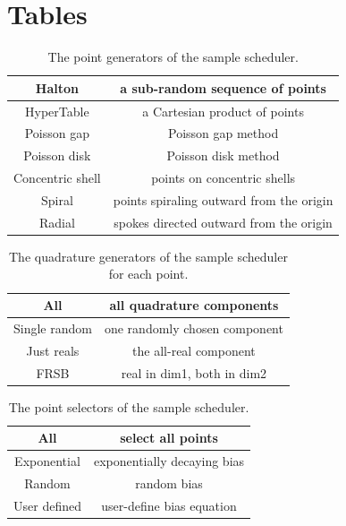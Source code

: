 \clearpage
\section{Tables}

\begin{table}[h]
  \begin{tabular}{ | c | c | }
    \hline
    Halton          &  a sub-random sequence of points            \\  \hline
    HyperTable      &  a Cartesian product of points              \\  \hline
    Poisson gap     &  Poisson gap method \\  \hline
    Poisson disk    &  Poisson disk method  \\  \hline
    Concentric shell & points on concentric shells               \\  \hline
    Spiral          &  points spiraling outward from the origin  \\  \hline
    Radial          &  spokes directed outward from the origin  \\  \hline
  \end{tabular}
  \caption{The point generators of the sample scheduler.}
  \label{scheduler_point_generators}
\end{table}

\begin{table}[h]
  \begin{tabular}{ | c | c | }
    \hline
    All             &  all quadrature components        \\  \hline
    Single random   &  one randomly chosen component    \\  \hline
    Just reals      &  the all-real component           \\  \hline
    FRSB            &  real in dim1, both in dim2       \\  \hline
  \end{tabular}
  \caption{The quadrature generators of the sample scheduler for each point.}
  \label{scheduler_quadrature_generators}
\end{table}

\begin{table}[h]
  \begin{tabular}{ | c | c | }
    \hline
    All             &  select all points  \\  \hline
    Exponential     &  exponentially decaying bias  \\  \hline
    Random          &  random bias  \\  \hline
    User defined    &  user-define bias equation  \\  \hline
  \end{tabular}
  \caption{The point selectors of the sample scheduler.}
  \label{scheduler_point_selectors}
\end{table}

